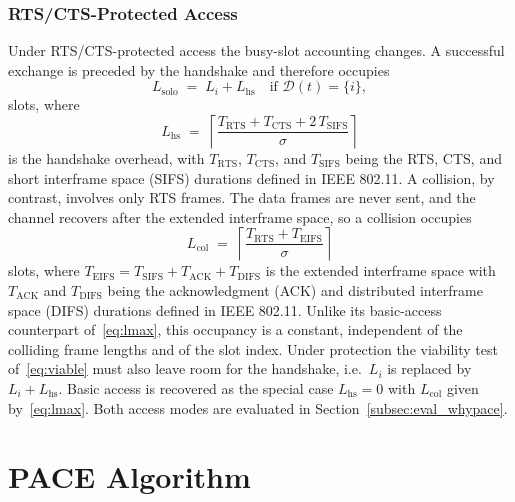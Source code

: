 \documentclass[conference]{IEEEtran}
\begin{document}
\subsubsection{RTS/CTS-Protected Access}
Under RTS/CTS-protected access the busy-slot accounting changes. A successful exchange is preceded by the handshake and therefore occupies
\begin{equation}
    L_\mathrm{solo} \;=\; L_i + L_\mathrm{hs} \quad \text{if } \mathcal{D}(t)=\{i\},
    \label{eq:lsolo_rts}
\end{equation}
slots, where
\begin{equation}
    L_\mathrm{hs} \;=\; \left\lceil
    \frac{T_\mathrm{RTS} + T_\mathrm{CTS} + 2\,T_\mathrm{SIFS}}{\sigma}
    \right\rceil
    \label{eq:oh_rts}
\end{equation}
is the handshake overhead, with $T_\mathrm{RTS}$, $T_\mathrm{CTS}$, and $T_\mathrm{SIFS}$ being the RTS, CTS, and short interframe space (SIFS) durations defined in IEEE 802.11. A collision, by contrast, involves only RTS frames. The data frames are never sent, and the channel recovers after the extended interframe space, so a collision occupies
\begin{equation}
    L_\mathrm{col} \;=\; \left\lceil
    \frac{T_\mathrm{RTS} + T_\mathrm{EIFS}}{\sigma} \right\rceil
    \label{eq:coll_rts}
\end{equation}
slots, where $T_\mathrm{EIFS}=T_\mathrm{SIFS}+T_\mathrm{ACK}+T_\mathrm{DIFS}$ is the extended interframe space with $T_\mathrm{ACK}$ and $T_\mathrm{DIFS}$ being the acknowledgment (ACK) and distributed interframe space (DIFS) durations defined in IEEE 802.11. Unlike its basic-access counterpart of~\eqref{eq:lmax}, this occupancy is a constant, independent of the colliding frame lengths and of the slot index. Under protection the viability test of~\eqref{eq:viable} must also leave room for the handshake, i.e.\ $L_i$ is replaced by $L_i+L_\mathrm{hs}$. Basic access is recovered as the special case $L_\mathrm{hs}=0$ with $L_\mathrm{col}$ given by~\eqref{eq:lmax}. Both access modes are evaluated in Section~\ref{subsec:eval_whypace}.

\section{PACE Algorithm}
\label{sec:pace_algorithm}
\end{document}
